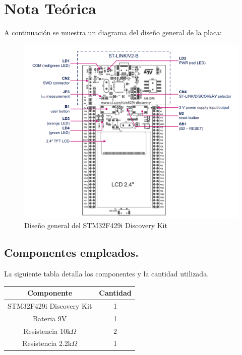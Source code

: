 \section{Nota Teórica}

A continuación se muestra un diagrama del diseño general de la placa:
\begin{figure}[H]
    \centering
    \includegraphics[scale=.5]{Imagenes/layout.png}
    \caption{Diseño general del STM32F429i Discovery Kit \cite{discovery}}
    \label{fig:diag_general}
\end{figure}

\subsection{Componentes empleados.}
La siguiente tabla detalla los componentes y la cantidad utilizada.
\begin{center}
    \begin{tabular}{|c|c|}
        \hline
         Componente & Cantidad\\ \hline
         STM32F429i Discovery Kit & 1\\
         Bateria 9V & 1 \\
         Resistencia 10k$\Omega$ & 2 \\
         Resistencia 2.2k$\Omega$ & 1 \\ \hline
    \end{tabular}
\end{center}

